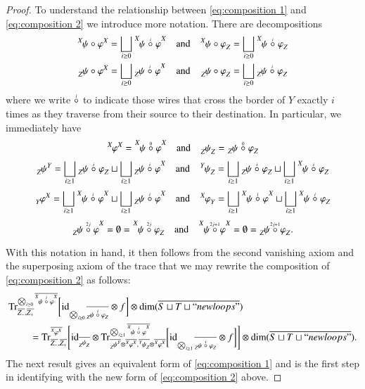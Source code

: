 \documentclass{amsart}
\def\tn{\textnormal}
\def\dim{\tn{dim}}
\def\Trace{\tn{Tr}}
\def\hsp{\hspace{.3in}}
\def\ol{\overline}
\def\id{\tn{id}}
\newcommand{\feeddd}[3]{{\tensor*[^{#2}_{\color{white}{!}}]{{#1}}{^{#3}}}}%
\newcommand{\feeddc}[3]{{\tensor*[^{#2}]{{#1}}{_{#3}}}}
\newcommand{\feedcd}[3]{{\tensor*[_{#2}]{{#1}}{^{#3}}}}
\newcommand{\feedcc}[3]{{\tensor*[^{\color{white}{!}}_{#2}]{{#1}}{_{#3}}}}
\theoremstyle{remark}
\theoremstyle{definition}
\begin{document}
\begin{proof}
To understand the relationship between \eqref{eq:composition 1} and \eqref{eq:composition 2} we introduce more notation.  There are decompositions
\begin{align*}
 \feeddd{\psi\circ\varphi}{X}{X}&=\bigsqcup_{i\ge0}\feeddd{\psi\;\accentset{i}{\circ}\;\varphi}{X}{X}&\text{and}&&\feeddc{\psi\circ\varphi}{X}{Z}&=\bigsqcup_{i\ge0}\feeddc{\psi\;\accentset{i}{\circ}\;\varphi}{X}{Z}\\
 \feedcd{\psi\circ\varphi}{Z}{X}&=\bigsqcup_{i\ge0}\feedcd{\psi\;\accentset{i}{\circ}\;\varphi}{Z}{X}&\text{and}&&\feedcc{\psi\circ\varphi}{Z}{Z}&=\bigsqcup_{i\ge0}\feedcc{\psi\;\accentset{i}{\circ}\;\varphi}{Z}{Z}
\end{align*}
where we write $\accentset{i}{\circ}$ to indicate those wires that cross the border of $Y$ exactly $i$ times as they traverse from their source to their destination.  In particular, we immediately have
\[\feeddd{\varphi}{X}{X}=\feeddd{\psi\;\accentset{0}{\circ}\;\varphi}{X}{X}\quad\text{and}\quad\feedcc{\psi}{Z}{Z}=\feedcc{\psi\;\accentset{0}{\circ}\;\varphi}{Z}{Z}\]
\[\feedcd{\psi}{Z}{Y}=\bigsqcup_{i\ge1}\feedcc{\psi\;\accentset{i}{\circ}\;\varphi}{Z}{Z}\sqcup\bigsqcup_{i\ge1}\feedcd{\psi\;\accentset{i}{\circ}\;\varphi}{Z}{X}\quad\text{and}\quad\feeddc{\psi}{Y}{Z}=\bigsqcup_{i\ge1}\feedcc{\psi\;\accentset{i}{\circ}\;\varphi}{Z}{Z}\sqcup\bigsqcup_{i\ge1}\feeddc{\psi\;\accentset{i}{\circ}\;\varphi}{X}{Z}\]
\[\feedcd{\varphi}{Y}{X}=\bigsqcup_{i\ge1}\feeddd{\psi\;\accentset{i}{\circ}\;\varphi}{X}{X}\sqcup\bigsqcup_{i\ge1}\feedcd{\psi\;\accentset{i}{\circ}\;\varphi}{Z}{X}\quad\text{and}\quad\feeddc{\varphi}{X}{Y}=\bigsqcup_{i\ge1}\feeddd{\psi\;\accentset{i}{\circ}\;\varphi}{X}{X}\sqcup\bigsqcup_{i\ge1}\feeddc{\psi\;\accentset{i}{\circ}\;\varphi}{X}{Z}\]
\[\feedcd{\psi\;\accentset{2j}{\circ}\;\varphi}{Z}{X}=\emptyset=\feeddc{\psi\;\accentset{2j}{\circ}\;\varphi}{X}{Z}\quad\text{and}\quad\feeddd{\psi\;\accentset{2j+1}{\circ}\;\varphi}{X}{X}=\emptyset=\feedcc{\psi\;\accentset{2j+1}{\circ}\;\varphi}{Z}{Z}.\]

With this notation in hand, it then follows from the second vanishing axiom and the superposing axiom of the trace that we may rewrite the composition of \eqref{eq:composition 2} as follows:
\begin{align*}
 &\Trace^{\bigotimes_{i\ge0}\ol{\feeddd{\psi\;\accentset{i}{\circ}\;\varphi}{X}{X}}}_{\ol{Z_-},\ol{Z_+}}\bigg[\id_{\bigotimes_{i\ge0}\ol{\feedcc{\psi\;\accentset{i}{\circ}\;\varphi}{Z}{Z}}}\otimes f\bigg]\otimes\dim(\ol{S\sqcup T\sqcup ``newloops"})\\
 &\hsp=\Trace^{\ol{\feeddd{\varphi}{X}{X}}}_{\ol{Z_-},\ol{Z_+}}\Bigg[
 \id_{\ol{\feedcc{\psi}{Z}{Z}}}\otimes\Trace^{\bigotimes_{i\ge1}\ol{\feeddd{\psi\;\accentset{i}{\circ}\;\varphi}{X}{X}}}_{\ol{\feedcd{\psi}{Z}{Y}}\otimes\ol{\feeddd{\varphi}{X}{X}},\ol{\feeddc{\psi}{Y}{Z}}\otimes\ol{\feeddd{\varphi}{X}{X}}}\bigg[\id_{\bigotimes_{i\ge1}\ol{\feedcc{\psi\;\accentset{i}{\circ}\;\varphi}{Z}{Z}}}\otimes f\bigg]
 \Bigg]\otimes\dim(\ol{S\sqcup T\sqcup ``newloops"}).
\end{align*}
The next result gives an equivalent form of \eqref{eq:composition 1} and is the first step in identifying with the new form of \eqref{eq:composition 2} above.


\end{proof}
\end{document}
